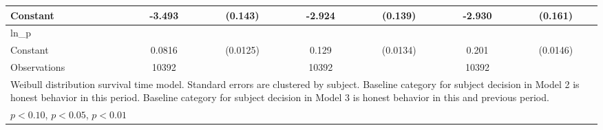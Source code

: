 {\begin{tabular}{l*{3}{cc}}
Constant        &   -3.493\sym{***}&  (0.143)&   -2.924\sym{***}&  (0.139)&   -2.930\sym{***}&  (0.161)\\
\hline
ln\_p            &                  &         &                  &         &                  &         \\
Constant        &   0.0816\sym{***}& (0.0125)&    0.129\sym{***}& (0.0134)&    0.201\sym{***}& (0.0146)\\
\hline
Observations    &    10392         &         &    10392         &         &    10392         &         \\
\hline\hline
\multicolumn{7}{l}{\footnotesize Weibull distribution survival time model. Standard errors are clustered by subject. Baseline category for subject decision in Model 2 is honest behavior in this period. Baseline category for subject decision in Model 3 is honest behavior in this and previous period.}\\
\multicolumn{7}{l}{\footnotesize \sym{*} \(p<0.10\), \sym{**} \(p<0.05\), \sym{***} \(p<0.01\)}\\
\end{tabular}
}
